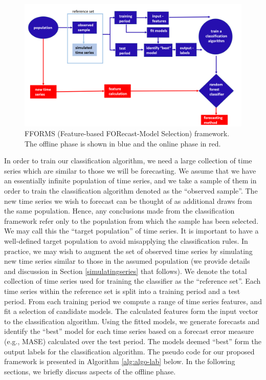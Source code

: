 \documentclass[11pt,a4paper,]{article}
\begin{document}
\begin{figure}

{\centering \includegraphics[width=\textwidth]{figures/framework} 

}

\caption{FFORMS (Feature-based FORecast-Model Selection) framework. The offline phase is shown in blue and the online phase in red.}\label{fig:framework}
\end{figure}

In order to train our classification algorithm, we need a large collection of time series which are similar to those we will be forecasting. We assume that we have an essentially infinite population of time series, and we take a sample of them in order to train the classification algorithm denoted as the ``observed sample''. The new time series we wish to forecast can be thought of as additional draws from the same population. Hence, any conclusions made from the classification framework refer only to the population from which the sample has been selected. We may call this the ``target population'' of time series. It is important to have a well-defined target population to avoid misapplying the classification rules. In practice, we may wish to augment the set of observed time series by simulating new time series similar to those in the assumed population (we provide details and discussion in Section \ref{simulatingseries} that follows). We denote the total collection of time series used for training the classifier as the ``reference set''.
Each time series within the reference set is split into a training period and a test period. From each training period we compute a range of time series features, and fit a selection of candidate models. The calculated features form the input vector to the classification algorithm. Using the fitted models, we generate forecasts and identify the ``best'' model for each time series based on a forecast error measure (e.g., MASE) calculated over the test period. The models deemed ``best'' form the output labels for the classification algorithm. The pseudo code for our proposed framework is presented in Algorithm \ref{alg:algo-lab} below. In the following sections, we briefly discuss aspects of the offline phase.
\end{document}
